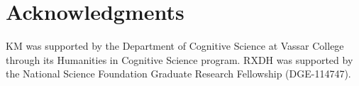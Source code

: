 \documentclass[10pt,letterpaper]{article}
\newcommand{\kushin}[1]{{\color{orange}{[kushin: #1]}}}
\begin{document}



 
 \section{Acknowledgments}
KM was supported by the Department of Cognitive Science at Vassar College through its Humanities in Cognitive Science program.
RXDH was supported by the National Science Foundation Graduate Research Fellowship (DGE-114747). 




\end{document}
